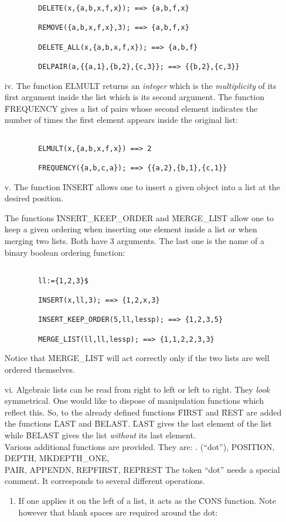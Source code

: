 \begin{itemize}
\begin{verbatim}
        DELETE(x,{a,b,x,f,x}); ==> {a,b,f,x}

        REMOVE({a,b,x,f,x},3); ==> {a,b,f,x}

        DELETE_ALL(x,{a,b,x,f,x}); ==> {a,b,f}

        DELPAIR(a,{{a,1},{b,2},{c,3}}; ==> {{b,2},{c,3}}

\end{verbatim}
\item[iv.]
The function \f{ELMULT} returns an {\em integer} which is the
{\em multiplicity} of its first argument inside the list which is its
second argument.
The function \f{FREQUENCY} gives a list of pairs
whose second element indicates the number of times the first element
appears inside the original list:
\begin{verbatim}

        ELMULT(x,{a,b,x,f,x}) ==> 2

        FREQUENCY({a,b,c,a}); ==> {{a,2},{b,1},{c,1}}

\end{verbatim}
\item[v.]
The function \f{INSERT} allows one to insert a given object into a list
at the desired position.

The functions \f{INSERT\_KEEP\_ORDER} and \f{MERGE\_LIST} allow one to
keep a given ordering when inserting one element inside a list or
when merging two lists. Both have 3 arguments. The last one  is
the name of a binary boolean ordering function:
\begin{verbatim}

        ll:={1,2,3}$

        INSERT(x,ll,3); ==> {1,2,x,3}

        INSERT_KEEP_ORDER(5,ll,lessp); ==> {1,2,3,5}

        MERGE_LIST(ll,ll,lessp); ==> {1,1,2,2,3,3}

\end{verbatim}
Notice that \f{MERGE\_LIST} will act correctly only if the two lists 
are well ordered themselves. 
\item[vi.]
Algebraic lists can be read from right to left or left to right.
They {\em look} symmetrical. One would like to dispose of manipulation
functions which reflect this.
So, to the already defined functions  \f{FIRST} and \f{REST} are
added the functions \f{LAST}  and \f{BELAST}. \f{LAST} gives the last
element of the list while \f{BELAST} gives the list {\em without} its
last element. \\
Various additional functions are provided. They are:
\bq
\noindent
\f{ . (``dot''), POSITION, DEPTH, MKDEPTH\_ONE, \\
PAIR, APPENDN, REPFIRST, REPREST}
\eq
The token ``dot'' needs a special comment. It corresponds to
several different operations.
\begin{enumerate}
\item If one applies it on the left of a list, it acts as the \f{CONS}
function. Note however that blank spaces are required around the dot:
\begin{verbatim}


\end{verbatim}
\end{enumerate}
\end{itemize}
